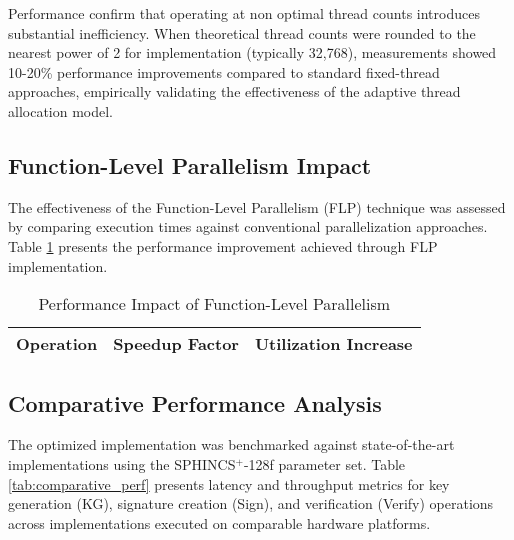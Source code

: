 \documentclass[journal]{IEEEtran}
\begin{document}
Performance confirm that operating at non optimal thread counts introduces substantial inefficiency.
When theoretical thread counts were rounded to the nearest power of 2 for implementation (typically 32,768), measurements showed 10-20\% performance improvements compared to standard fixed-thread approaches, empirically validating the effectiveness of the adaptive thread allocation model.

\subsection{Function-Level Parallelism Impact}

The effectiveness of the Function-Level Parallelism (FLP) technique was assessed by comparing execution times against conventional parallelization approaches. Table \ref{tab:flp_impact} presents the performance improvement achieved through FLP implementation.

\begin{table}[h]
  \centering
  \caption{Performance Impact of Function-Level Parallelism}
  \label{tab:flp_impact}
  \begin{tabular}{@{}lcc@{}}
    \toprule
    \textbf{Operation} & \textbf{Speedup Factor} & \textbf{Utilization Increase} \\
    \midrule
    \bottomrule
  \end{tabular}
\end{table}

\subsection{Comparative Performance Analysis}

The optimized implementation was benchmarked against state-of-the-art implementations using the SPHINCS$^+$-128f parameter set. Table \ref{tab:comparative_perf} presents latency and throughput metrics for key generation (KG), signature creation (Sign), and verification (Verify) operations across implementations executed on comparable hardware platforms.
\end{document}
